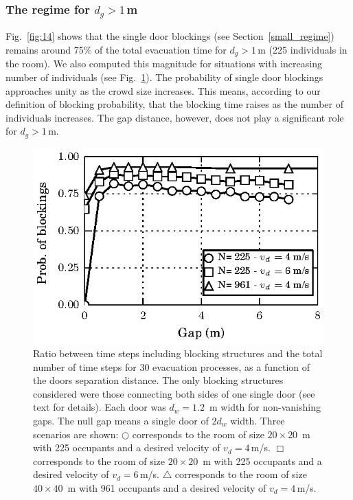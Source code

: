 \subsubsection{\label{large_regime} The regime for $d_g>1\,$m}

Fig.~\ref{fig:14} shows that the single door blockings (see 
 Section~\ref{small_regime}) remains around 75\% of the total evacuation time 
for $d_g>1\,$m (225 individuals in the room). We also computed this magnitude 
for situations with increasing number of individuals (see Fig.~\ref{fig:15}). 
The probability of single door blockings approaches unity as the crowd size 
increases. This means, according to our definition of blocking probability, 
that the blocking time raises as the number of individuals increases. The gap 
distance, however, does not play a significant role for $d_g>1\,$m.  \\ 


\begin{figure}
\includegraphics[width=\columnwidth]{./fig13.eps}
\caption{\label{fig:15} Ratio between time steps including blocking structures 
and the total number of time steps for 30 evacuation processes, as a function 
of the doors separation distance. The only blocking structures considered 
were those connecting both sides of one single door (see text for details). 
Each door was $d_w=1.2$~m width for non-vanishing gaps. The null gap means a 
single door of $2d_w$ width. Three scenarios are shown: $\bigcirc$ 
corresponds to the room of size $20\times20$~m with 225 occupants and a 
desired velocity of $v_d=4\,$m/s. $\Box$ corresponds to the room of size  
$20\times20$~m with 225 occupants and a desired velocity of $v_d=6\,$m/s. 
$\bigtriangleup$ corresponds to the room of size $40\times40$~m with 961 
occupants and a desired velocity of $v_d=4\,$m/s.   }
\end{figure}

